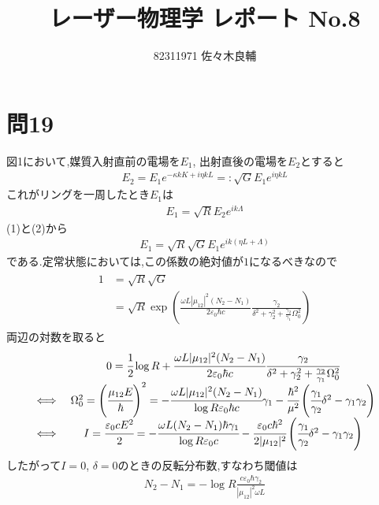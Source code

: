 \documentclass[uplatex,a4j,11pt,dvipdfmx]{jsarticle}
\begin{document}
\title{レーザー物理学 レポート No.8}
\author{82311971 佐々木良輔}
\date{}
\maketitle
\section*{問19}
図1において,媒質入射直前の電場を$E_1$, 出射直後の電場を$E_2$とすると
\begin{align}
  E_2=E_1e^{-\kappa kK+i\eta kL}=:\sqrt{G}E_1e^{i\eta kL}
\end{align}
これがリングを一周したとき$E_1$は
\begin{align}
  E_1=\sqrt{R}E_2e^{ik\Lambda}
\end{align}
(1)と(2)から
\begin{align}
  E_1=\sqrt{R}\sqrt{G}E_1e^{ik(\eta L+\Lambda)}
\end{align}
である.定常状態においては,この係数の絶対値が$1$になるべきなので
\begin{align}
  \begin{split}
    1&=\sqrt{R}\sqrt{G}\\
    &=\sqrt{R}\exp\left(\frac{\omega L|\mu_{12}|^2(N_2-N_1)}{2\varepsilon_0\hbar c}\frac{\gamma_2}{\delta^2+\gamma_2^2+\frac{\gamma_2}{\gamma_1}\Omega_0^2}\right)
  \end{split}
\end{align}
両辺の対数を取ると
\begin{align}
  \begin{array}{cc}
    &0=\cfrac{1}{2}\log R+\cfrac{\omega L|\mu_{12}|^2(N_2-N_1)}{2\varepsilon_0\hbar c}\cfrac{\gamma_2}{\delta^2+\gamma_2^2+\frac{\gamma_2}{\gamma_1}\Omega_0^2}\\
    \iff&\Omega_0^2=\left(\cfrac{\mu_{12} E}{\hbar}\right)^2=-\cfrac{\omega L|\mu_{12}|^2(N_2-N_1)}{\log R\varepsilon_0\hbar c}\gamma_1-\cfrac{\hbar^2}{\mu^2}\left(\cfrac{\gamma_1}{\gamma_2}\delta^2-\gamma_1\gamma_2\right)\\
    \iff&I=\cfrac{\varepsilon_0cE^2}{2}=-\cfrac{\omega L(N_2-N_1)\hbar\gamma_1}{\log R\varepsilon_0c}-\cfrac{\varepsilon_0c\hbar^2}{2|\mu_{12}|^2}\left(\cfrac{\gamma_1}{\gamma_2}\delta^2-\gamma_1\gamma_2\right)
  \end{array}
\end{align}
したがって$I=0$, $\delta=0$のときの反転分布数,すなわち閾値は
\begin{align}
  N_2-N_1=-\log R\frac{c\varepsilon_0\hbar\gamma_2}{|\mu_{12}|^2\omega L}
\end{align}
\end{document}
